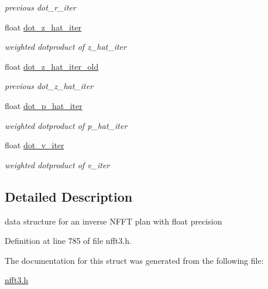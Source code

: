 \begin{DoxyCompactItemize}
\begin{DoxyCompactList}\small\item\em previous dot\-\_\-r\-\_\-iter \end{DoxyCompactList}\item 
\hypertarget{structsolverf__plan__complex_adeec40c2b8450cd7486f8524c6dcc3d4}{float \hyperlink{structsolverf__plan__complex_adeec40c2b8450cd7486f8524c6dcc3d4}{dot\-\_\-z\-\_\-hat\-\_\-iter}}\label{structsolverf__plan__complex_adeec40c2b8450cd7486f8524c6dcc3d4}

\begin{DoxyCompactList}\small\item\em weighted dotproduct of z\-\_\-hat\-\_\-iter \end{DoxyCompactList}\item 
\hypertarget{structsolverf__plan__complex_a71e2482ed0eb34229fb166d6821d1a03}{float \hyperlink{structsolverf__plan__complex_a71e2482ed0eb34229fb166d6821d1a03}{dot\-\_\-z\-\_\-hat\-\_\-iter\-\_\-old}}\label{structsolverf__plan__complex_a71e2482ed0eb34229fb166d6821d1a03}

\begin{DoxyCompactList}\small\item\em previous dot\-\_\-z\-\_\-hat\-\_\-iter \end{DoxyCompactList}\item 
\hypertarget{structsolverf__plan__complex_a3d2a5ea538a77dc4f2da9b53beab9c01}{float \hyperlink{structsolverf__plan__complex_a3d2a5ea538a77dc4f2da9b53beab9c01}{dot\-\_\-p\-\_\-hat\-\_\-iter}}\label{structsolverf__plan__complex_a3d2a5ea538a77dc4f2da9b53beab9c01}

\begin{DoxyCompactList}\small\item\em weighted dotproduct of p\-\_\-hat\-\_\-iter \end{DoxyCompactList}\item 
\hypertarget{structsolverf__plan__complex_a46f2243aac9e8e4689ab7f06914d3f97}{float \hyperlink{structsolverf__plan__complex_a46f2243aac9e8e4689ab7f06914d3f97}{dot\-\_\-v\-\_\-iter}}\label{structsolverf__plan__complex_a46f2243aac9e8e4689ab7f06914d3f97}

\begin{DoxyCompactList}\small\item\em weighted dotproduct of v\-\_\-iter \end{DoxyCompactList}\end{DoxyCompactItemize}


\subsection{Detailed Description}
data structure for an inverse N\-F\-F\-T plan with float precision 

Definition at line 785 of file nfft3.\-h.



The documentation for this struct was generated from the following file\-:\begin{DoxyCompactItemize}
\item 
\hyperlink{nfft3_8h}{nfft3.\-h}\end{DoxyCompactItemize}
